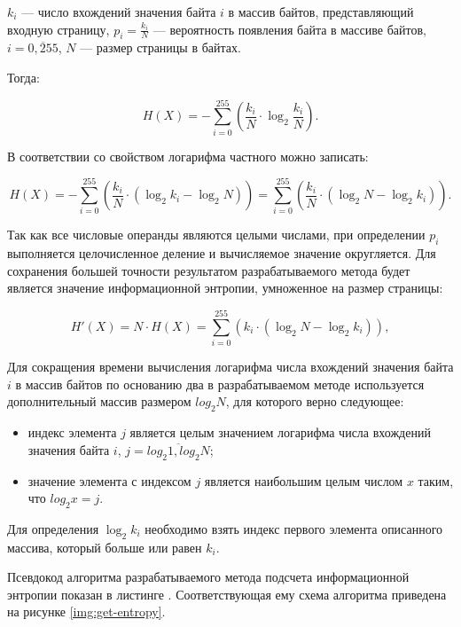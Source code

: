  $k_{i}$ --- число вхождений значения байта $i$ в массив байтов, представляющий входную страницу, $p_{i} = \frac{k_{i}}{N}$ --- вероятность появления байта в массиве байтов, $i = \overline{0, 255}$, $N$ --- размер страницы в байтах.

Тогда:

\begin{equation}
	H(X) = -\sum_{i = 0}^{255} (\frac{k_{i}}{N} \cdot \log_{2}\frac{k_{i}}{N}).
\end{equation}

В соответствии со свойством логарифма частного можно записать:

\begin{equation}
	H(X) = -\sum_{i = 0}^{255} (\frac{k_{i}}{N} \cdot (\log_{2}k_{i} - \log_{2}N)) = \sum_{i = 0}^{255} (\frac{k_{i}}{N} \cdot (\log_{2}N - \log_{2}k_{i})).
\end{equation}

Так как все числовые операнды являются целыми числами, при определении $p_{i}$ выполняется целочисленное деление и вычисляемое значение округляется. Для сохранения большей точности результатом разрабатываемого метода будет является значение информационной энтропии, умноженное на размер страницы:

\begin{equation}
	H'(X) = N \cdot H(X) = \sum_{i = 0}^{255} (k_{i} \cdot (\log_{2}N - \log_{2}k_{i})),
\end{equation}

Для сокращения времени вычисления логарифма числа вхождений значения байта $i$ в массив байтов по основанию два в разрабатываемом методе используется дополнительный массив размером $log_{2}N$, для которого верно следующее: 

\begin{itemize}
	\item индекс элемента $j$ является целым значением логарифма числа вхождений значения байта $i$, $j = \overline{log_{2}1, log_{2}N}$;
	\item значение элемента с индексом $j$ является наибольшим целым числом $x$ таким, что $log_{2}x = j$.
\end{itemize}

Для определения $\log_{2}k_{i}$ необходимо взять индекс первого элемента описанного массива, который больше или равен $k_i$.

Псевдокод алгоритма разрабатываемого метода подсчета информационной энтропии показан в листинге . Соответствующая ему схема алгоритма приведена на рисунке \ref{img:get-entropy}.

